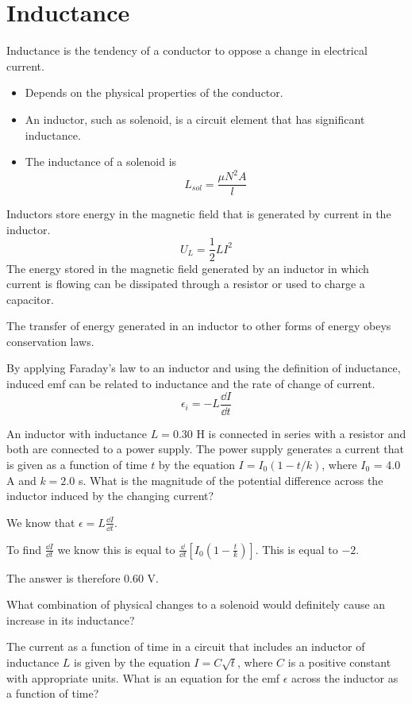 \documentclass[../em.tex]{subfiles}
\begin{document}
\section{Inductance}
Inductance is the tendency of a conductor to oppose a change in electrical current.
\begin{itemize}
    \item Depends on the physical properties of the conductor.
    \item An inductor, such as solenoid, is a circuit element that has significant inductance.
    \item The inductance of a solenoid is 
    \[ L_{sol} = \frac{\mu N^2 A}{l} \]
\end{itemize}

Inductors store energy in the magnetic field that is generated by current in the inductor.
\[ U_L = \frac{1}{2}LI^2 \]
The energy stored in the magnetic field generated by an inductor in which current is flowing can be dissipated through a resistor or used to charge a capacitor.

The transfer of energy generated in an inductor to other forms of energy obeys conservation laws.

By applying Faraday's law to an inductor and using the definition of inductance, induced emf can be related to inductance and the rate of change of current.
\[ \epsilon_i = -L \frac{\dd I}{\dd t} \]

\begin{example}
    An inductor with inductance $L=0.30$ H is connected in series with a resistor and both are connected to a power supply. The power supply generates a current that is given as a function of time $t$
    by the equation $I=I_0(1-t/k)$, where $I_0$ = 4.0 A and $k=2.0$ s. What is the magnitude of the potential difference across the inductor induced by the changing current?

    We know that $\epsilon = L\frac{\dd I}{\dd t}$. 

    To find $\frac{\dd I}{\dd t}$ we know this is equal to $\frac{\dd}{\dd t}\left[ I_0\left(1-\frac{t}{k}\right)\right]$. This is equal to $-2$.

    The answer is therefore $0.60$ V.
\end{example}

\ex What combination of physical changes to a solenoid would definitely cause an increase in its inductance?

\ex The current as a function of time in a circuit that includes an inductor of inductance $L$ is given by the equation $I=C\sqrt{t}$, where $C$ is a positive constant with appropriate units.
What is an equation for the emf $\epsilon$ across the inductor as a function of time?
\end{document}
